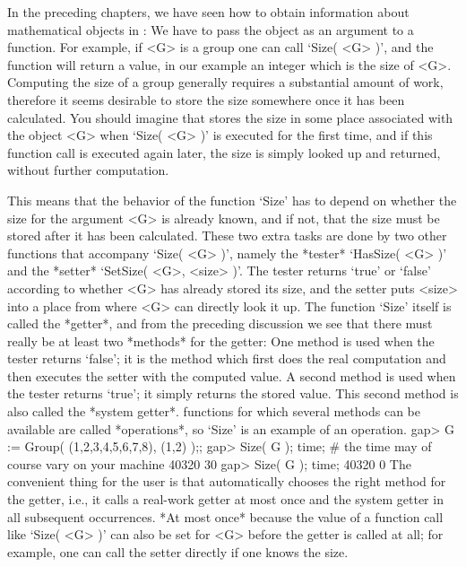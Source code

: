 



In the  preceding chapters, we have  seen how to obtain information about
mathematical objects in {\GAP}: We have to pass the object as an argument
to a function. For example, if <G> is a group one can call
`Size( <G> )', and the function will return a value,
in our example an integer  which is the  size of <G>. Computing
the size  of a  group generally  requires  a substantial amount  of work,
therefore it seems desirable to store the size somewhere once it has been
calculated. You should imagine that {\GAP} stores  the size in some place
associated  with the object  <G> when `Size( <G>  )'  is executed for the
first time, and if this function  call is executed  again later, the size
is simply looked up and returned, without further computation.

This means that the  behavior  of the  function  `Size' has to  depend on
whether the size for the argument <G> is already known,  and if not, that
the size  must be  stored after it  has been  calculated. These two extra
tasks are  done  by two other   functions that accompany `Size(   <G> )',
namely the *tester* `HasSize( <G> )'
and the *setter* `SetSize( <G>, <size> )'.
The tester returns `true' or `false' according to
whether <G> has already stored its size, and the setter puts <size> into
a place from where <G> can directly look it up.
The function `Size' itself is called the *getter*,
and from the preceding discussion we see
that there must really be at least two *methods* for the getter:
One method is used when the tester returns `false';
it is the method which first does the real computation and then executes
the setter with the computed value.
A second method is used when the tester returns `true';
it simply returns the stored value.
This second method is also called the *system getter*.
{\GAP} functions for which several methods can be available
are called *operations*, so `Size' is an example of an operation.
\beginexample
gap> G := Group( (1,2,3,4,5,6,7,8), (1,2) );;
gap> Size( G ); time;   # the time may of course vary on your machine
40320
30
gap> Size( G ); time;
40320
0
\endexample
The convenient thing  for the user  is that  {\GAP} automatically chooses
the right method  for the getter, i.e.,  it calls a real-work getter at
most once  and the system getter  in all subsequent occurrences. *At most
once* because the value of a function call like `Size( <G> )' can also be
set for <G>  before the getter  is called at all;
for example, one can call the setter directly if one knows the size.

